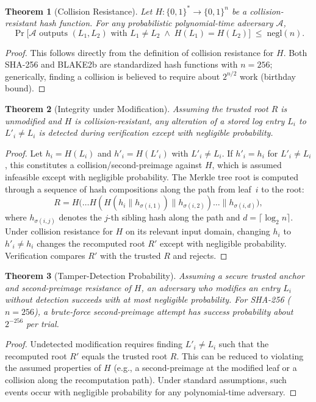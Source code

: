 \documentclass[preprint,12pt]{elsarticle}
\newtheorem{theorem}{Theorem}
\begin{document}
\begin{theorem}[Collision Resistance]
\label{thm:collision}
Let $H : \{0,1\}^* \to \{0,1\}^n$ be a collision-resistant hash function.
For any probabilistic polynomial-time adversary $\mathcal{A}$,
\[
  \Pr\bigl[\mathcal{A} \text{ outputs } (L_1, L_2) \text{ with }
    L_1 \neq L_2 \;\wedge\; H(L_1) = H(L_2)\bigr]
  \;\le\; \mathrm{negl}(n).
\]
\end{theorem}
\begin{proof}
This follows directly from the definition of collision resistance for $H$.
Both SHA-256 \citep{dang2015nist} and BLAKE2b \citep{aumasson2013blake2} are standardized hash functions with $n = 256$; generically, finding a collision is believed to require about $2^{n/2}$ work (birthday bound).
\end{proof}

\begin{theorem}[Integrity under Modification]
\label{thm:integrity}
Assuming the trusted root $R$ is unmodified and $H$ is collision-resistant, any alteration of a stored log entry $L_i$ to $L'_i \neq L_i$ is detected during verification except with negligible probability.
\end{theorem}
\begin{proof}
Let $h_i = H(L_i)$ and $h'_i = H(L'_i)$ with $L'_i \neq L_i$.
If $h'_i = h_i$ for $L'_i \neq L_i$, this constitutes a collision/second-preimage against $H$, which is assumed infeasible except with negligible probability.
The Merkle tree root is computed through a sequence of hash compositions along the path from leaf~$i$ to the root:
\[
  R = H\bigl(\ldots H(H(h_i \| h_{\sigma(i,1)}) \| h_{\sigma(i,2)}) \ldots \| h_{\sigma(i,d)}\bigr),
\]
where $h_{\sigma(i,j)}$ denotes the $j$-th sibling hash along the path and $d = \lceil \log_2 n \rceil$.
Under collision resistance for $H$ on its relevant input domain, changing $h_i$ to $h'_i \neq h_i$ changes the recomputed root $R'$ except with negligible probability.
Verification compares $R'$ with the trusted $R$ and rejects.
\end{proof}

\begin{theorem}[Tamper-Detection Probability]
\label{thm:detection}
Assuming a secure trusted anchor and second-preimage resistance of $H$, an adversary who modifies an entry $L_i$ without detection succeeds with at most negligible probability.
For SHA-256 ($n = 256$), a brute-force second-preimage attempt has success probability about $2^{-256}$ per trial.
\end{theorem}
\begin{proof}
Undetected modification requires finding $L'_i \neq L_i$ such that the recomputed root $R'$ equals the trusted root $R$.
This can be reduced to violating the assumed properties of $H$ (e.g., a second-preimage at the modified leaf or a collision along the recomputation path).
Under standard assumptions, such events occur with negligible probability for any polynomial-time adversary.
\end{proof}
\end{document}
